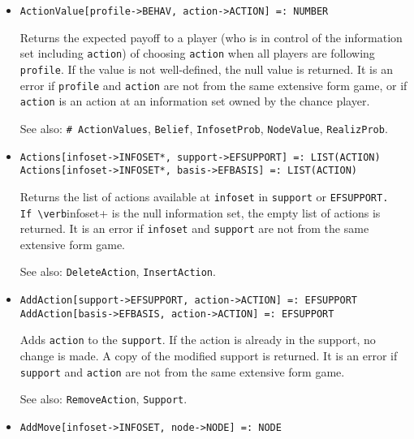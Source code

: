 \begin{itemize}
\item{}
\protect \large \begin{verbatim}
ActionValue[profile->BEHAV, action->ACTION] =: NUMBER 
\end{verbatim}\normalsize

\bd 
Returns the expected payoff to a player (who is in control of the
information set including \verb+action+) of choosing \verb+action+ when
all players are following \verb+profile+.  If the value is not
well-defined, the null value is returned.  It is an error if
\verb+profile+ and \verb+action+ are not from the same extensive form
game, or if \verb+action+ is an action at an information set owned by
the chance player.

\item [See also:] \verb+# ActionValues+, \verb+Belief+,
\verb+InfosetProb+, \verb+NodeValue+, \verb+RealizProb+.  
\ed

\item{}
\protect \large \begin{verbatim} 
Actions[infoset->INFOSET*, support->EFSUPPORT] =: LIST(ACTION) 
Actions[infoset->INFOSET*, basis->EFBASIS] =: LIST(ACTION) 
\end{verbatim}\normalsize

\bd
Returns the list of actions available at \verb+infoset+ in
\verb+support+ or \verb+EFSUPPORT.  If \verb+infoset+ is the null
information set, the empty list of actions is returned.  It is an
error if \verb+infoset+ and \verb+support+ are not from the same
extensive form game.

\item [See also:] \verb+DeleteAction+, \verb+InsertAction+.
\ed

\item{}
\protect \large \begin{verbatim} 
AddAction[support->EFSUPPORT, action->ACTION] =: EFSUPPORT 
AddAction[basis->EFBASIS, action->ACTION] =: EFSUPPORT 
\end{verbatim}\normalsize

\bd 
Adds \verb+action+ to the \verb+support+.  If the action is already in
the support, no change is made.  A copy of the modified support is
returned.  It is an error if \verb+support+ and \verb+action+ are not from the
same extensive form game.

\item [See also:] \verb+RemoveAction+, \verb+Support+.
\ed

\item{}
\protect \large \begin{verbatim} 
AddMove[infoset->INFOSET, node->NODE] =: NODE 
\end{verbatim}\normalsize


\end{itemize}
